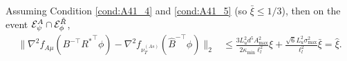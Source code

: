\begin{lemma}
	\label{lem:Binversenablavariation1}
	Assuming Condition \eqref{cond:A41_4} and \eqref{cond:A41_5} (so $\bar{\xi} \le 1/3$), then on the event $\mathcal{E}^A_{\psi}\cap \mathcal{E}^{\tilde{R}}_{\phi}$,
	\begin{align*}
	\|\nabla^2 f_{A\mu}(B^{-\top}{R^*}^{\top}\phi) - \nabla^2 f_{\nu_T^{(As)}}(\hat{B}^{-\top}\phi)  \|_2 
	& \le 
	\frac{3L_u^2d^5A^2_{\max}}{2\kappa_{\min}\ell_l^2}\xi + \frac{\sqrt{6}L_u^2\sigma_{\max}^2}{\ell_l^2}\bar{\xi}
	= \hat{\xi}.
	\end{align*}
\end{lemma}
